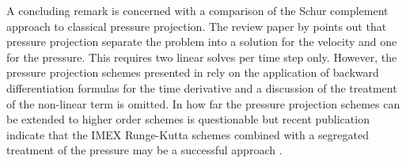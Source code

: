 A concluding remark is concerned with a comparison of the Schur complement approach to classical pressure projection. The review paper by \citeauthor{Guermond2006} points out that pressure projection separate the problem into a solution for the velocity and one for the pressure. This requires two linear solves per time step only. However, the pressure projection schemes presented in \cite{Guermond2006} rely on the application of backward differentiation formulas for the time derivative and a discussion of the treatment of the non-linear term is omitted. In how far the pressure projection schemes can be extended to higher order schemes is questionable but recent publication indicate that the IMEX Runge-Kutta schemes combined with a segregated treatment of the pressure may be a successful approach \cite{Ansorge2017,Colomes2015}.

